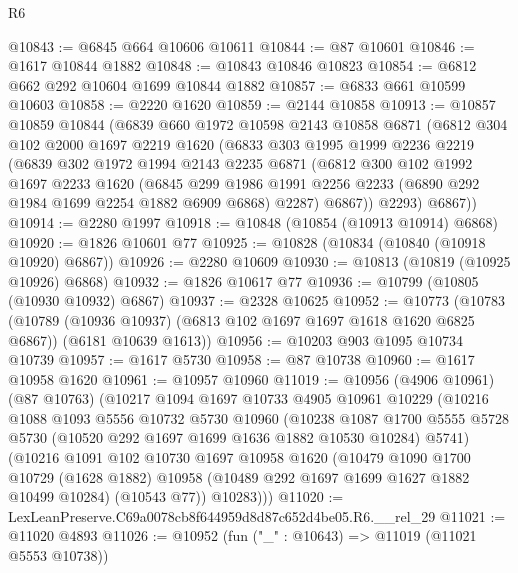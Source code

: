 \begin{lexlean}{R6}
\begin{coremodule}
@10843 := @6845 @664 @10606 @10611
@10844 := @87 @10601
@10846 := @1617 @10844 @1882
@10848 := @10843 @10846 @10823
@10854 := @6812 @662 @292 @10604 @1699 @10844 @1882
@10857 := @6833 @661 @10599 @10603
@10858 := @2220 @1620
@10859 := @2144 @10858
@10913 := @10857
    @10859
    @10844
    (@6839
      @660
      @1972
      @10598
      @2143
      @10858
      @6871
      (@6812
        @304
        @102
        @2000
        @1697
        @2219
        @1620
        (@6833
          @303
          @1995
          @1999
          @2236
          @2219
          (@6839
            @302
            @1972
            @1994
            @2143
            @2235
            @6871
            (@6812
              @300
              @102
              @1992
              @1697
              @2233
              @1620
              (@6845
                @299
                @1986
                @1991
                @2256
                @2233
                (@6890 @292 @1984 @1699 @2254 @1882 @6909 @6868)
                @2287)
              @6867))
          @2293)
        @6867))
@10914 := @2280 @1997
@10918 := @10848 (@10854 (@10913 @10914) @6868)
@10920 := @1826 @10601 @77
@10925 := @10828 (@10834 (@10840 (@10918 @10920) @6867))
@10926 := @2280 @10609
@10930 := @10813 (@10819 (@10925 @10926) @6868)
@10932 := @1826 @10617 @77
@10936 := @10799 (@10805 (@10930 @10932) @6867)
@10937 := @2328 @10625
@10952 := @10773
    (@10783
      (@10789 (@10936 @10937) (@6813 @102 @1697 @1697 @1618 @1620 @6825 @6867))
      (@6181 @10639 @1613))
@10956 := @10203 @903 @1095 @10734 @10739
@10957 := @1617 @5730
@10958 := @87 @10738
@10960 := @1617 @10958 @1620
@10961 := @10957 @10960
@11019 := @10956
    (@4906 @10961)
    (@87 @10763)
    (@10217
      @1094
      @1697
      @10733
      @4905
      @10961
      @10229
      (@10216
        @1088
        @1093
        @5556
        @10732
        @5730
        @10960
        (@10238
          @1087
          @1700
          @5555
          @5728
          @5730
          (@10520 @292 @1697 @1699 @1636 @1882 @10530 @10284)
          @5741)
        (@10216
          @1091
          @102
          @10730
          @1697
          @10958
          @1620
          (@10479
            @1090
            @1700
            @10729
            (@1628 @1882)
            @10958
            (@10489 @292 @1697 @1699 @1627 @1882 @10499 @10284)
            (@10543 @77))
          @10283)))
@11020 := LexLeanPreserve.C69a0078cb8f644959d8d87c652d4be05.R6.__rel_29
@11021 := @11020 @4893
@11026 := @10952 (fun ("_" : @10643) => @11019 (@11021 @5553 @10738))

\end{coremodule}
\end{lexlean}

